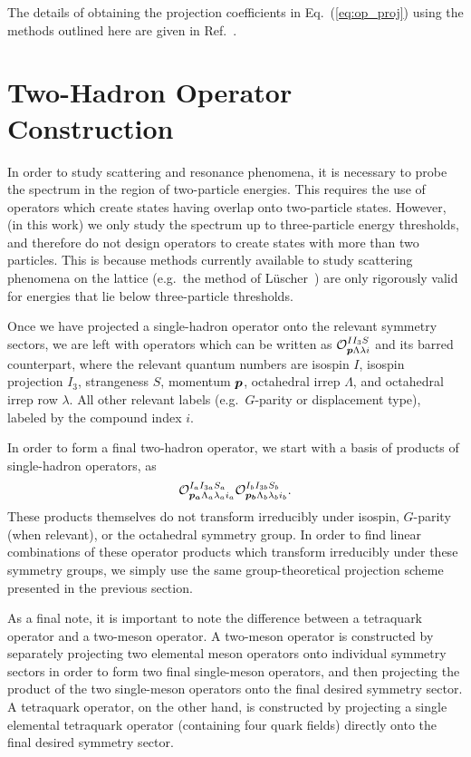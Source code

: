    The details of obtaining the projection coefficients in Eq.~(\ref{eq:op_proj}) using the methods outlined here are given in Ref.~\cite{Basak:2005aq}.
    \section{Two-Hadron Operator Construction}
    In order to study scattering and resonance phenomena, it is necessary to probe the spectrum in the region of two-particle energies. This requires the use of operators which create states having overlap onto two-particle states. However, (in this work) we only study the spectrum up to three-particle energy thresholds, and therefore do not design operators to create states with more than two particles. This is because methods currently available to study scattering phenomena on the lattice (e.g.~the method of L\"uscher~\cite{Luscher:1990ck}) are only rigorously valid for energies that lie below three-particle thresholds.

    Once we have projected a single-hadron operator onto the relevant symmetry sectors, we are left with operators which can be written as $\mathcal O_{\boldsymbol{p} \Lambda \lambda i}^{I I_3 S}$ and its barred counterpart, where the relevant quantum numbers are isospin $I$, isospin projection $I_3$, strangeness $S$, momentum $\boldsymbol{p}$, octahedral irrep $\Lambda$, and octahedral irrep row $\lambda$. All other relevant labels (e.g.\ $G$-parity or displacement type), labeled by the compound index $i$.
    
    In order to form a final two-hadron operator, we start with a basis of products of single-hadron operators, as
    \begin{equation}
        \mathcal O_{\boldsymbol{p_a} \Lambda_a \lambda_a i_a}^{I_a I_{3a} S_a} \mathcal O_{\boldsymbol{p_b} \Lambda_b \lambda_b i_b}^{I_b I_{3b} S_b}.
    \end{equation}
    These products themselves do not transform irreducibly under isospin, $G$-parity (when relevant), or the octahedral symmetry group. In order to find linear combinations of these operator products which transform irreducibly under these symmetry groups, we simply use the same group-theoretical projection scheme presented in the previous section.

    As a final note, it is important to note the difference between a tetraquark operator and a two-meson operator. A two-meson operator is constructed by separately projecting two elemental meson operators onto individual symmetry sectors in order to form two final single-meson operators, and then projecting the product of the two single-meson operators onto the final desired symmetry sector. A tetraquark operator, on the other hand, is constructed by projecting a single elemental tetraquark operator (containing four quark fields) directly onto the final desired symmetry sector.